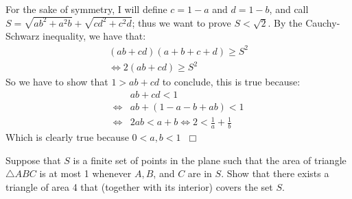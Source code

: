 \begin{solution}
    For the sake of symmetry, I will define $c=1-a$ and $d=1-b$, and call $S=\sqrt{ab^2+a^2b}+\sqrt{cd^2+c^2d}$; thus we want to prove $S<\sqrt2$. By the Cauchy-Schwarz inequality, we have that:
    \begin{align*}
        (ab+cd)(a+b+c+d) \geq S^2\\
        \iff 2(ab+cd) \geq S^2
    \end{align*}
    So we have to show that $1>ab+cd$ to conclude, this is true because:
    \begin{align*}
        &ab+cd<1 \\
         \iff &ab+(1-a-b+ab)<1 \\
        \iff &2ab<a+b \iff 2 < \frac{1}{a} + \frac{1}{b}
    \end{align*}
    Which is clearly true because $0<a,b<1 \hspace{7pt} \Box$
\end{solution}

\begin{problem}[G][6][Putnam 2016 B3]
    Suppose that $S$ is a finite set of points in the plane such that the area of triangle $\triangle ABC$ is at most 1 whenever $A, B$, and $C$ are in $S$. Show that there exists a triangle of area 4 that (together with its interior) covers the set $S$.
\end{problem}

